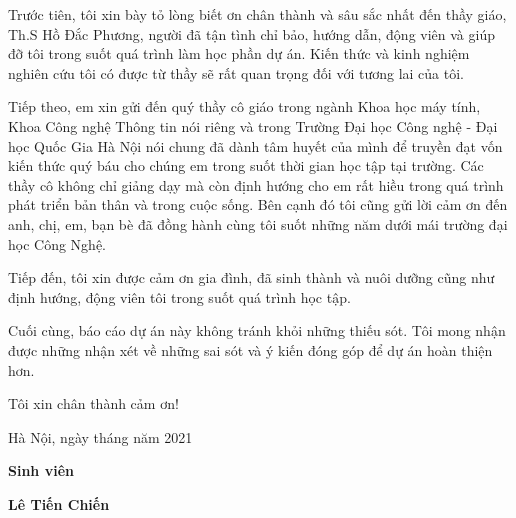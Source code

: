 Trước tiên, tôi xin bày tỏ lòng biết ơn chân thành và sâu sắc nhất đến thầy giáo, Th.S Hồ Đắc Phương, người đã tận tình chỉ bảo, hướng dẫn, động viên và giúp đỡ tôi trong suốt quá trình làm học phần dự án. Kiến thức và kinh nghiệm nghiên cứu tôi có được từ thầy sẽ rất quan trọng đối với tương lai của tôi.

Tiếp theo, em xin gửi đến quý thầy cô giáo trong ngành Khoa học máy tính, Khoa Công nghệ Thông tin nói riêng và trong Trường Đại học Công nghệ - Đại học Quốc Gia Hà Nội nói chung đã dành tâm huyết của mình để truyền đạt vốn kiến thức quý báu cho chúng em trong suốt thời gian học tập tại trường. Các thầy cô không chỉ giảng dạy mà còn định hướng cho em rất hiều trong quá trình phát triển bản thân và trong cuộc sống. Bên cạnh đó tôi cũng gửi lời cảm ơn đến anh, chị, em, bạn bè đã đồng hành cùng tôi suốt những năm dưới mái trường đại học Công Nghệ.

Tiếp đến, tôi xin được cảm ơn gia đình, đã sinh thành và nuôi dưỡng cũng như định hướng, động viên tôi trong suốt quá trình học tập.

Cuối cùng, báo cáo dự án này không tránh khỏi những thiếu sót. Tôi mong nhận được những nhận xét về những sai sót và ý kiến đóng góp để dự án hoàn thiện hơn.

Tôi xin chân thành cảm ơn!

\begin{flushright}
Hà Nội, ngày tháng năm 2021

\textbf{Sinh viên}

\bigskip
\bigskip

\textbf{Lê Tiến Chiến}
\end{flushright}
